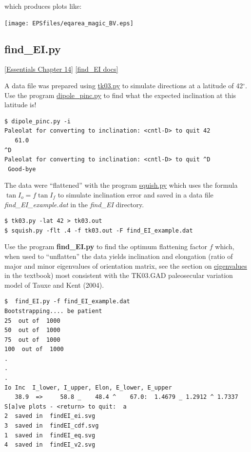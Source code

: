 \documentclass[11pt]{book}
\begin{document}
{{which produces plots like:

 \texttt{[image: EPSfiles/eqarea\_magic\_BV.eps]}



\subsection{find\_EI.py}
 \href{http://earthref.org/MAGIC/books/Tauxe/Essentials/WebBook3ch14.html#ch14}{ [Essentials Chapter 14]}%
\href{https://github.com/PmagPy/PmagPy/blob/master/programs/find_EI.py}{[find\_EI docs]}

A data file was prepared using \href{#tk03}{tk03.py} to simulate directions at a latitude of 42$^{\circ}$.   Use the program \href{#dipole_pinc.py}{dipole\_pinc.py} to find what the expected inclination at this latitude is!

\begin{verbatim}
$ dipole_pinc.py -i
Paleolat for converting to inclination: <cntl-D> to quit 42
   61.0
^D
Paleolat for converting to inclination: <cntl-D> to quit ^D
 Good-bye
\end{verbatim}


The data were ``flattened'' with the program \href{#squish.py}{squish.py} which uses the formula $ \tan I_o = f \tan I_f$ to simulate inclination error and saved in a data file {\it find\_EI\_example.dat} in the {\it find\_EI} directory.

\begin{verbatim}
$ tk03.py -lat 42 > tk03.out
$ squish.py -flt .4 -f tk03.out -F find_EI_example.dat
\end{verbatim}

Use the program {\bf find\_EI.py} to find the optimum flattening factor $f$ which, when used to ``unflatten'' the data  yields inclination   and  elongation (ratio of major and minor eigenvalues of orientation matrix, see the section on  \href{Webbook2.html#orientation_tensor}{eigenvalues} in the textbook)  most consistent with the TK03.GAD paleosecular variation model of Tauxe and Kent (2004). \nocite{tauxe04d}


\begin{verbatim}
$  find_EI.py -f find_EI_example.dat
Bootstrapping.... be patient
25  out of  1000
50  out of  1000
75  out of  1000
100  out of  1000
.
.
.
Io Inc  I_lower, I_upper, Elon, E_lower, E_upper
   38.9  =>     58.8 _    48.4 ^    67.0:  1.4679 _ 1.2912 ^ 1.7337
S[a]ve plots - <return> to quit:  a
2  saved in  findEI_ei.svg
3  saved in  findEI_cdf.svg
1  saved in  findEI_eq.svg
4  saved in  findEI_v2.svg



\end{verbatim}}}
\end{document}
